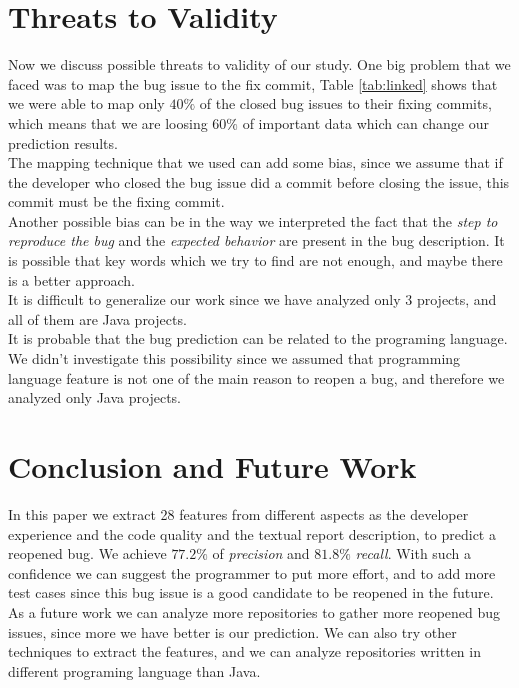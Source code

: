 \documentclass[sigconf,review]{acmart}
\begin{document}
\section{Threats to Validity}
Now we discuss possible threats to validity of our study. One big problem that we faced was to map the bug issue to the fix commit, Table \ref{tab:linked} shows that we were able to map only $40\%$ of the closed bug issues to their fixing commits, which means that we are loosing $60\%$ of important data which can change our prediction results.\\
The mapping technique that we used can add some bias, since we assume that if the developer who closed the bug issue did a commit before closing the issue, this commit must be the fixing commit.\\
Another possible bias can be in the way we interpreted the fact that the \emph{step to reproduce the bug} and the \emph{expected behavior} are present in the bug description. It is possible that key words which we try to find are not enough, and maybe there is a better approach.\\
It is difficult to generalize our work since we have analyzed only 3 projects, and all of them are Java projects.\\ It is probable that the bug prediction can be related to the programing language. We didn't investigate this possibility since we assumed that programming language feature is not one of the main reason to reopen a bug, and therefore we analyzed only Java projects. 




\section{Conclusion and Future Work}
In this paper we extract 28 features from different aspects as the developer experience and the code quality and the textual report description, to predict a reopened bug. We achieve $77.2\%$ of \emph{precision} and $81.8\%$ \emph{recall}. With such a confidence we can suggest the programmer to put more effort, and to add more test cases since this bug issue is a good candidate to be reopened in the future.\\
As a future work we can analyze more repositories to gather more reopened bug issues, since more we have better is our prediction. We can also try other techniques to extract the features, and we can analyze repositories written in different programing language than Java.




\end{document}
